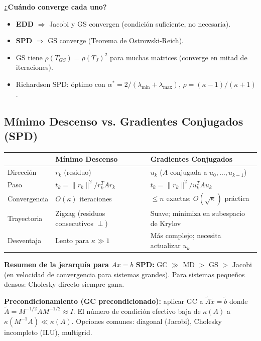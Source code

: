 \documentclass[12pt,a4paper]{article}
\begin{document}
\textbf{¿Cuándo converge cada uno?}
\begin{itemize}[noitemsep]
  \item \textbf{EDD} $\Rightarrow$ Jacobi y GS convergen (condición suficiente, no necesaria).
  \item \textbf{SPD} $\Rightarrow$ GS converge (Teorema de Ostrowski-Reich).
  \item GS tiene $\rho(T_{GS})=\rho(T_J)^2$ para muchas matrices (converge en mitad de iteraciones).
  \item Richardson SPD: óptimo con $\alpha^*=2/(\lambda_{\min}+\lambda_{\max})$, $\rho=(\kappa-1)/(\kappa+1)$.
\end{itemize}

\subsection{Mínimo Descenso vs. Gradientes Conjugados (SPD)}

\begin{center}
\renewcommand{\arraystretch}{1.3}
\begin{tabular}{lll}
\toprule
 & \textbf{Mínimo Descenso} & \textbf{Gradientes Conjugados} \\
\midrule
Dirección & $r_k$ (residuo) & $u_k$ ($A$-conjugada a $u_0,\ldots,u_{k-1}$) \\
Paso & $t_k=\|r_k\|^2/r_k^TAr_k$ & $t_k=\|r_k\|^2/u_k^TAu_k$ \\
Convergencia & $O(\kappa)$ iteraciones & $\le n$ exactas; $O(\sqrt{\kappa})$ práctica \\
Trayectoria & Zigzag (residuos consecutivos $\perp$) & Suave; minimiza en subespacio de Krylov \\
Desventaja & Lento para $\kappa\gg1$ & Más complejo; necesita actualizar $u_k$ \\
\bottomrule
\end{tabular}
\end{center}

\begin{alerta}
\textbf{Resumen de la jerarquía para $Ax=b$ SPD:}
GC $\gg$ MD $>$ GS $>$ Jacobi (en velocidad de convergencia para sistemas grandes).
Para sistemas pequeños densos: Cholesky directo siempre gana.
\end{alerta}

\textbf{Precondicionamiento (GC precondicionado):} aplicar GC a $\tilde A\tilde x=\tilde b$ donde $\tilde A=M^{-1/2}AM^{-1/2}\approx I$. El número de condición efectivo baja de $\kappa(A)$ a $\kappa(M^{-1}A)\ll\kappa(A)$. Opciones comunes: diagonal (Jacobi), Cholesky incompleto (ILU), multigrid.
\end{document}
